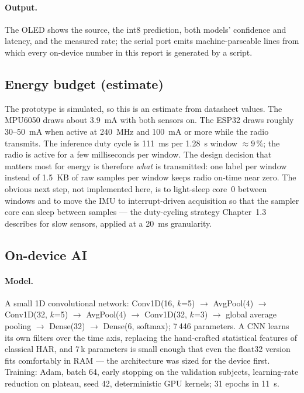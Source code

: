 \documentclass[10pt,a4paper]{article}
\begin{document}
\paragraph{Output.} The OLED shows the source, the int8 prediction, both models' confidence and latency, and the measured rate; the serial port emits machine-parseable lines from which every on-device number in this report is generated by a script.

\subsection{Energy budget (estimate)}

The prototype is simulated, so this is an estimate from datasheet values. The MPU6050 draws about \SI{3.9}{mA} with both sensors on. The ESP32 draws roughly 30--\SI{50}{mA} when active at \SI{240}{MHz} and \SI{100}{mA} or more while the radio transmits. The inference duty cycle is \SI{111}{ms} per \SI{1.28}{s} window $\approx 9\,\%$; the radio is active for a few milliseconds per window. The design decision that matters most for energy is therefore \emph{what} is transmitted: one label per window instead of \SI{1.5}{KB} of raw samples per window keeps radio on-time near zero. The obvious next step, not implemented here, is to light-sleep core~0 between windows and to move the IMU to interrupt-driven acquisition so that the sampler core can sleep between samples --- the duty-cycling strategy Chapter~1.3 describes for slow sensors, applied at a \SI{20}{ms} granularity.

\subsection{On-device AI}\label{sec:ai}

\paragraph{Model.} A small 1D convolutional network: Conv1D(16, $k$=5) $\rightarrow$ AvgPool(4) $\rightarrow$ Conv1D(32, $k$=5) $\rightarrow$ AvgPool(4) $\rightarrow$ Conv1D(32, $k$=3) $\rightarrow$ global average pooling $\rightarrow$ Dense(32) $\rightarrow$ Dense(6, softmax); 7\,446 parameters. A CNN learns its own filters over the time axis, replacing the hand-crafted statistical features of classical HAR, and 7\,k parameters is small enough that even the float32 version fits comfortably in RAM --- the architecture was sized for the device first. Training: Adam, batch 64, early stopping on the validation subjects, learning-rate reduction on plateau, seed 42, deterministic GPU kernels; 31 epochs in \SI{11}{s}.
\end{document}
